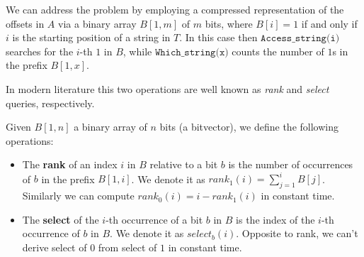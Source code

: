 We can address the problem by employing a compressed representation of the offsets in $A$ via a binary array $B[1,m]$ of $m$ bits, where $B[i] = 1$ if and only if $i$ is the starting position of a string in $T$. In this case then $\texttt{Access\_string(i)}$ searches for the $i$-th $1$ in $B$, while $\texttt{Which\_string(x)}$ counts the number of $1$s in the prefix $B[1,x]$.

In modern literature this two operations are well known as \textit{rank} and \textit{select} queries, respectively.

\begin{definition}\label{def:rankselect}
    Given $B[1,n]$ a binary array of $n$ bits (a bitvector), we define the following operations:
    \begin{itemize}
        \item The \textbf{rank} of an index $i$ in $B$ relative to a bit $b$ is the number of occurrences of $b$ in the prefix $B[1,i]$. We denote it as $rank_1(i) = \sum_{j=1}^{i} B[j]$. Similarly we can compute $rank_0(i) = i - rank_1(i)$ in constant time.
        \item The \textbf{select} of the $i$-th occurrence of a bit $b$ in $B$ is the index of the $i$-th occurrence of $b$ in $B$. We denote it as $select_b(i)$. Opposite to rank, we can't derive select of $0$ from select of $1$ in constant time.
    \end{itemize}
\end{definition}

